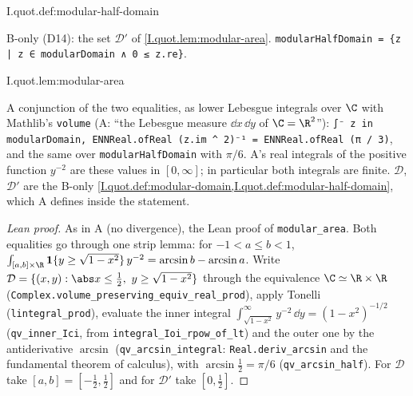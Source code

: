\begin{definition}
\bonly
{}
\end{definition}
\begin{tfformal}{I.quot.def:modular-half-domain}
\begin{tffidelity}
B-only (D14): the set $\mathcal D'$ of \cref{I.quot.lem:modular-area}. \texttt{modularHalfDomain = \{z | z ∈ modularDomain ∧ 0 ≤ z.re\}}.
\end{tffidelity}
\end{tfformal}

\begin{lemma}
\end{lemma}
\begin{tfformal}{I.quot.lem:modular-area}
\begin{tffidelity}
A conjunction of the two equalities, as lower Lebesgue integrals over $\C$ with Mathlib's \texttt{volume} (A: ``the Lebesgue measure $\dd x\,\dd y$ of $\C=\R^2$''): \texttt{∫⁻ z in modularDomain, ENNReal.ofReal (z.im \textasciicircum{} 2)⁻¹ = ENNReal.ofReal (π / 3)}, and the same over \texttt{modularHalfDomain} with $\pi/6$. A's real integrals of the positive function $y^{-2}$ are these values in $[0,\infty]$; in particular both integrals are finite. $\mathcal D$, $\mathcal D'$ are the B-only \cref{I.quot.def:modular-domain,I.quot.def:modular-half-domain}, which A defines inside the statement.
\end{tffidelity}
\end{tfformal}
\begin{proof}[Lean proof]
As in A (no divergence), the Lean proof of \texttt{modular\_area}. Both equalities go through one strip lemma: for $-1<a\le b<1$, $\int_{[a,b]\times\R}\mathbf 1\{y\ge\sqrt{1-x^2}\}\,y^{-2}=\arcsin b-\arcsin a$. Write $\mathcal D=\{(x,y):\abs x\le\frac12,\ y\ge\sqrt{1-x^2}\}$ through the equivalence $\C\simeq\R\times\R$ (\texttt{Complex.volume\_preserving\_equiv\_real\_prod}), apply Tonelli (\texttt{lintegral\_prod}), evaluate the inner integral $\int_{\sqrt{1-x^2}}^\infty y^{-2}\,\dd y=(1-x^2)^{-1/2}$ (\texttt{qv\_inner\_Ici}, from \texttt{integral\_Ioi\_rpow\_of\_lt}) and the outer one by the antiderivative $\arcsin$ (\texttt{qv\_arcsin\_integral}: \texttt{Real.deriv\_arcsin} and the fundamental theorem of calculus), with $\arcsin\frac12=\pi/6$ (\texttt{qv\_arcsin\_half}). For $\mathcal D$ take $[a,b]=[-\frac12,\frac12]$ and for $\mathcal D'$ take $[0,\frac12]$.
\end{proof}

